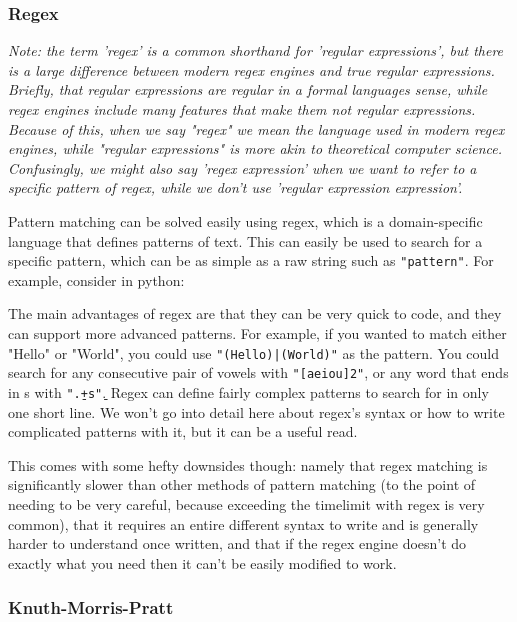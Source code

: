 \subsubsection{Regex}

\textit{Note: the term 'regex' is a common shorthand for 'regular expressions', but there is a large difference between modern regex engines and true regular expressions. Briefly, that regular expressions are regular in a formal languages sense, while regex engines include many features that make them not regular expressions. Because of this, when we say "regex" we mean the language used in modern regex engines, while "regular expressions" is more akin to theoretical computer science. Confusingly, we might also say 'regex expression' when we want to refer to a specific pattern of regex, while we don't use 'regular expression expression'.}

Pattern matching can be solved easily using regex, which is a domain-specific language that defines patterns of text. This can easily be used to search for a specific pattern, which can be as simple as a raw string such as \texttt{"pattern"}. For example, consider in python:


The main advantages of regex are that they can be very quick to code, and they can support more advanced patterns. For example, if you wanted to match either "Hello" or "World", you could use \texttt{"(Hello)|(World)"} as the pattern. You could search for any consecutive pair of vowels with \texttt{"[aeiou]{2}"}, or any word that ends in s with \texttt{"\b.+s\b"}. Regex can define fairly complex patterns to search for in only one short line. We won't go into detail here about regex's syntax or how to write complicated patterns with it, but it can be a useful read.

This comes with some hefty downsides though: namely that regex matching is significantly slower than other methods of pattern matching (to the point of needing to be very careful, because exceeding the timelimit with regex is very common), that it requires an entire different syntax to write and is generally harder to understand once written, and that if the regex engine doesn't do exactly what you need then it can't be easily modified to work.

\subsubsection{Knuth-Morris-Pratt}

